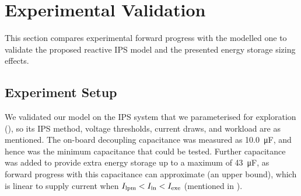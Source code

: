 \section{Experimental Validation} \label{sec:c3_experiment}

This section compares experimental forward progress with the modelled one to validate the proposed reactive IPS model and the presented energy storage sizing effects. 


\subsection{Experiment Setup}

We validated our model on the IPS system that we parameterised for exploration (), so its IPS method, voltage thresholds, current draws, and workload are as mentioned.
The on-board decoupling capacitance was measured as \SI{10.0}{\micro\farad}, and hence was the minimum capacitance that could be tested. 
Further capacitance was added to provide extra energy storage up to a maximum of \SI{43}{\micro\farad}, as forward progress with this capacitance can approximate  (an upper bound), which is linear to supply current  when $I_{\text{lpm}} < I_{\text{in}} < I_{\text{exe}}$ (mentioned in ).


